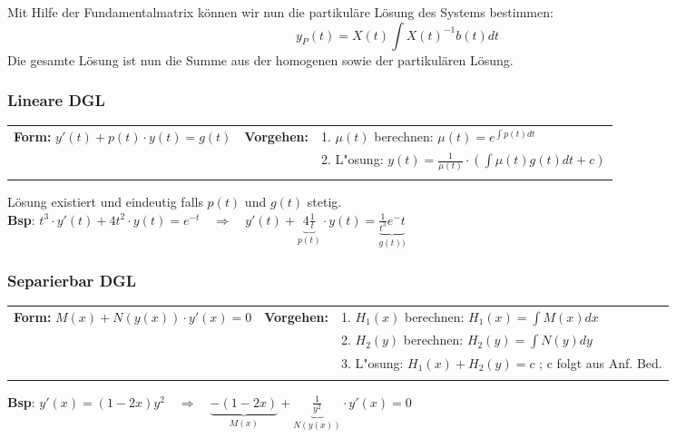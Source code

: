 Mit Hilfe der Fundamentalmatrix können wir nun die partikuläre Lösung des Systems bestimmen:\\
\begin{equation*}
y_P(t) = X(t) \int{X(t)^{-1}b(t)dt}
\end{equation*}
Die gesamte Lösung ist nun die Summe aus der homogenen sowie der partikulären Lösung.

\subsubsection{Lineare DGL}
\begin{tabular}{p{6cm}p{2cm}p{10.5cm}}
\textbf{Form:} $y'(t) + p(t) \cdot y(t) = g(t)$ &
\textbf{Vorgehen:}              &

1. $\mu(t)$ berechnen: $\mu(t) = e^{\int p(t) dt}$ \\ &&
2. L"osung: $y(t) = \frac{1}{\mu(t)} \cdot ( \int \mu(t) g(t) dt +c)$ \\ &&
\end{tabular}
Lösung existiert und eindeutig falls $p(t)$ und $g(t)$ stetig.\\
\textbf{Bsp}: $t^3 \cdot y'(t) + 4 t^2 \cdot y(t) = e^{-t} \quad \Longrightarrow \quad y'(t) + \underbrace{4 \frac{1}{t}}_{p(t)} \cdot y(t) = \underbrace{\frac{1}{t^3} e^-t}_{g(t))}$

\subsubsection{Separierbar DGL}
\begin{tabular}{p{6cm}p{2cm}p{10.5cm}}
\textbf{Form:} $M(x) + N(y(x))\cdot y'(x) = 0$ &
\textbf{Vorgehen:}              &

1. $H_1(x)$ berechnen: $H_1(x) = \int M(x) dx$ \\ &&
2. $H_2(y)$ berechnen: $H_2(y) = \int N(y)dy$ \\ &&
3. L"osung: $H_1(x) + H_2(y) = c$ ; c folgt aus Anf. Bed.\\\\
\end{tabular}
\textbf{Bsp}: $y'(x) = (1-2x)y^2 \quad \Longrightarrow \quad \underbrace{-(1-2x)}_{M(x)} + \underbrace{\frac{1}{y^2}}_{N(y(x))} \cdot y'(x) = 0$

